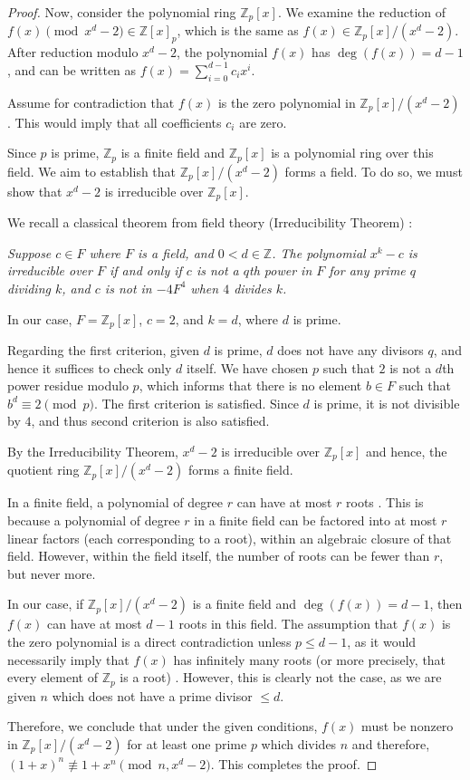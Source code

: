 \documentclass{article}
\theoremstyle{plain}
\theoremstyle{definition}
\begin{document}
\begin{proof}
Now, consider the polynomial ring $\mathbb{Z}_p[x]$. We examine the reduction of $f(x) \pmod{x^d - 2} \in \mathbb{Z}[x]_p$, which is the same as $f(x) \in \mathbb{Z}_p[x]/(x^d - 2)$. After reduction modulo $x^d - 2$, the polynomial $f(x)$ has $\deg(f(x)) = d-1$, and can be written as $f(x) = \sum_{i=0}^{d-1} c_i x^i$.

Assume for contradiction that $f(x)$ is the zero polynomial in $\mathbb{Z}_p[x]/(x^d - 2)$. This would imply that all coefficients $c_i$ are zero.

Since $p$ is prime, $\mathbb{Z}_p$ is a finite field and $\mathbb{Z}_p[x]$ is a polynomial ring over this field. We aim to establish that $\mathbb{Z}_p[x]/(x^d - 2)$ forms a field. To do so, we must show that $x^d - 2$ is irreducible over $\mathbb{Z}_p[x]$.

We recall a classical theorem from field theory (Irreducibility Theorem) \cite{karpilovsky1989fields}:

\textit{Suppose $c \in F$ where $F$ is a field, and $0 < d \in \mathbb{Z}$. The polynomial $x^k - c$ is irreducible over $F$ if and only if $c$ is not a $q$th power in $F$ for any prime $q$ dividing $k$, and $c$ is not in $-4F^4$ when $4$ divides $k$.}

In our case, $F = \mathbb{Z}_p[x]$, $c = 2$, and $k = d$, where $d$ is prime.

Regarding the first criterion, given $d$ is prime, $d$ does not have any divisors $q$, and hence it suffices to check only $d$ itself. We have chosen $p$ such that $2$ is not a $d$th power residue modulo $p$, which informs that there is no element $b \in F$ such that $b^d \equiv 2 \pmod{p}$. The first criterion is satisfied. Since $d$ is prime, it is not divisible by $4$, and thus second criterion is also satisfied.

By the Irreducibility Theorem, $x^d - 2$ is irreducible over $\mathbb{Z}_p[x]$ and hence, the quotient ring $\mathbb{Z}_p[x]/(x^d - 2)$ forms a finite field.

In a finite field, a polynomial of degree $r$ can have at most $r$ roots \cite{dummit2004abstractalgebra}. This is because a polynomial of degree $r$ in a finite field can be factored into at most $r$ linear factors (each corresponding to a root), within an algebraic closure of that field. However, within the field itself, the number of roots can be fewer than $r$, but never more.

In our case, if $\mathbb{Z}_p[x]/(x^d - 2)$ is a finite field and $\deg(f(x)) = d-1$, then $f(x)$ can have at most $d-1$ roots in this field. The assumption that $f(x)$ is the zero polynomial is a direct contradiction unless $p \leq d-1$, as it would necessarily imply that $f(x)$ has infinitely many roots (or more precisely, that every element of $\mathbb{Z}_p$ is a root) \cite{koppartywang2014roots}. However, this is clearly not the case, as we are given $n$ which does not have a prime divisor $\leq d$.

Therefore, we conclude that under the given conditions, $f(x)$ must be nonzero in $\mathbb{Z}_p[x]/(x^d - 2)$ for at least one prime $p$ which divides $n$ and therefore, $(1 + x)^n \not\equiv 1 + x^n \pmod{n, x^d-2}$. This completes the proof.
\end{proof}
\end{document}
